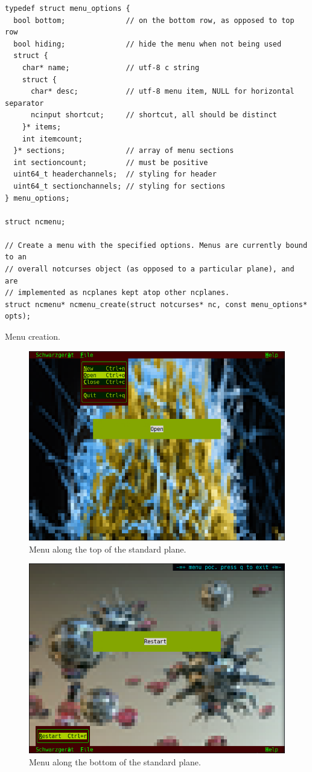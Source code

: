 \documentclass[letterpaper,10pt]{article}
\begin{document}
\begin{listing}[!htb]
\begin{verbatim}
typedef struct menu_options {
  bool bottom;              // on the bottom row, as opposed to top row
  bool hiding;              // hide the menu when not being used
  struct {
    char* name;             // utf-8 c string
    struct {
      char* desc;           // utf-8 menu item, NULL for horizontal separator
      ncinput shortcut;     // shortcut, all should be distinct
    }* items;
    int itemcount;
  }* sections;              // array of menu sections
  int sectioncount;         // must be positive
  uint64_t headerchannels;  // styling for header
  uint64_t sectionchannels; // styling for sections
} menu_options;

struct ncmenu;

// Create a menu with the specified options. Menus are currently bound to an
// overall notcurses object (as opposed to a particular plane), and are
// implemented as ncplanes kept atop other ncplanes.
struct ncmenu* ncmenu_create(struct notcurses* nc, const menu_options* opts);
\end{verbatim}
\caption{Menu creation.}
\end{listing}

\begin{figure}
    \centering
    \includegraphics[width=.75\linewidth]{media/menutop.png}
    \caption{Menu along the top of the standard plane.}
\end{figure}

\begin{figure}
    \centering
    \includegraphics[width=.75\linewidth]{media/menubottom.png}
    \caption{Menu along the bottom of the standard plane.}
\end{figure}
\end{document}
